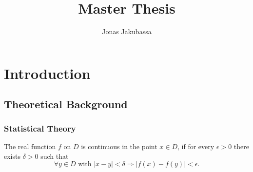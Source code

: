 \documentclass{book}
\title{Master Thesis}
\author{Jonas Jakubassa}
\begin{document}
\maketitle
\newpage

\tableofcontents
\newpage


\chapter{Introduction}
\section{Theoretical Background}
\subsection{Statistical Theory}

The real function $f$ on $D$ is continuous in the point $x \in D$, if for every $\epsilon>0$ there exists $\delta>0$ such that
$$
\forall y \in D \text { with }|x-y|<\delta \Longrightarrow|f(x)-f(y)|<\epsilon .
$$
\end{document}

